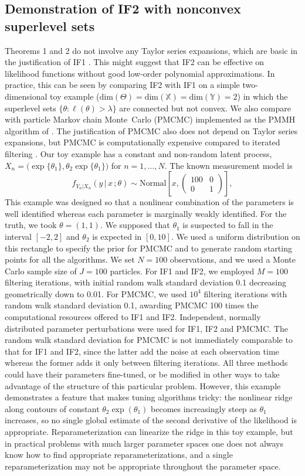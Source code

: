 \documentclass{pnastwo}\usepackage[]{graphicx}\usepackage[]{color}
\newcommand\level{{\lambda}}
\newcommand\normal{{\mathrm{Normal}}}
\newcommand\given{{\, | \,}}
\newcommand\giventh{\,;}
\newcommand\lik{\ell}
\newcommand\Xspace{{\mathbb X}}
\newcommand\Yspace{{\mathbb Y}}
\newcommand\Thetaspace{{\bbTheta}}
\newcommand\Xdim{{\mathrm{dim}}(\Xspace)}
\newcommand\Ydim{{\mathrm{dim}}(\Yspace)}
\newcommand\Thetadim{{\mathrm{dim}}(\Thetaspace)}
\newcommand{\bbTheta}{\Theta}
\begin{document}
\begin{article}
\section{Demonstration of IF2 with nonconvex superlevel sets} \label{sec:toy}
Theorems 1 and 2 do not involve any Taylor series expansions, which are basic in the justification of IF1 \cite{ionides11}.
This might suggest that IF2 can be effective on likelihood functions without good low-order polynomial approximations.
In practice, this can be seen by comparing IF2 with IF1 on a simple two-dimensional toy example ($\Thetadim=\Xdim=\Ydim=2$) in which the superlevel sets $\{\theta: \lik(\theta)>\level\}$ are connected but not convex.
We also compare with particle Markov chain Monte~Carlo (PMCMC) implemented as the PMMH algorithm of \cite{andrieu10}. 
The justification of PMCMC also does not depend on Taylor series expansions, but PMCMC is computationally expensive compared to iterated filtering \cite{bhadra10}.
Our toy example has a constant and non-random latent process,
$X_n=\big(\exp\{\theta_1\},\theta_2\exp\{\theta_1\}\big)$ 
for $n=1,\dots,N$. 
The known measurement model is
\[
f_{Y_n|X_n}(y\given x\giventh\theta) \sim \normal\left[ x, \left(\begin{array}{cc} 100 & 0 \\ 0 & 1 \end{array}\right)\right],
\]
This example was designed so that a nonlinear combination of the parameters is well identified whereas each parameter is marginally weakly identified.   
For the truth, we took $\theta=(1,1)$. We supposed that $\theta_1$ is suspected to fall in the interval $[-2,2]$ and $\theta_2$ is expected in $[0,10]$. 
We used a uniform distribution on this rectangle to specify the prior for PMCMC and to generate random starting points for all the algorithms.
We set $N=100$ observations, and we used a Monte Carlo sample size of $J=100$ particles. 
For IF1 and IF2, we employed $M=100$ filtering iterations, with initial random walk standard deviation 0.1 decreasing geometrically down to 0.01. 
For PMCMC, we used $10^4$ filtering iterations with random walk standard deviation 0.1, awarding PMCMC 100 times the computational resources offered to IF1 and IF2.
Independent, normally distributed parameter perturbations were used for IF1, IF2 and PMCMC.
The random walk standard deviation for PMCMC is not immediately comparable to that for IF1 and IF2, since the latter add the noise at each observation time whereas the former adds it only between filtering iterations. 
All three methods could have their parameters fine-tuned, or be modified in other ways to take advantage of the structure of this particular problem.
However, this example demonstrates a feature that makes tuning algorithms tricky: the nonlinear ridge along contours of constant $\theta_2\exp(\theta_1)$ becomes increasingly steep as $\theta_1$ increases, so no single global estimate of the second derivative of the likelihood is appropriate.
Reparameterization can linearize the ridge in this toy example, but in practical problems with much larger parameter spaces one does not always know how to find appropriate reparameterizations, and a single reparameterization may not be appropriate throughout the parameter space. 



\end{article}
\end{document}

